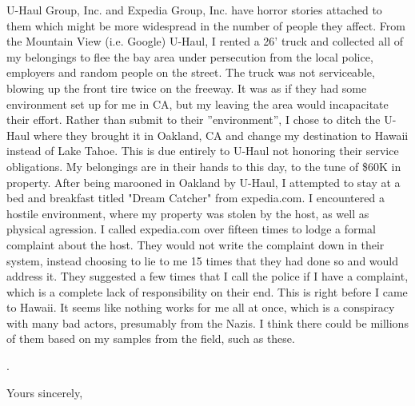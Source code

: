 \documentclass[a4paper]{arthur-letter}
\begin{document}
\begin{letter}
    U-Haul Group, Inc. and Expedia Group, Inc. have horror stories attached to them which might be more widespread in the number of people they affect. From the Mountain View (i.e. Google) U-Haul, I rented a 26' truck and collected all of my belongings to flee the bay area under persecution from the local police, employers and random people on the street. The truck was not serviceable, blowing up the front tire twice on the freeway. It was as if they had some environment set up for me in CA, but my leaving the area would incapacitate their effort. Rather than submit to their ''environment'', I chose to ditch the U-Haul where they brought it in Oakland, CA and change my destination to Hawaii instead of Lake Tahoe. This is due entirely to U-Haul not honoring their service obligations. My belongings are in their hands to this day, to the tune of \$60K in property. After being marooned in Oakland by U-Haul, I attempted to stay at a bed and breakfast titled "Dream Catcher" from expedia.com. I encountered a hostile environment, where my property was stolen by the host, as well as physical agression. I called expedia.com over fifteen times to lodge a formal complaint about the host. They would not write the complaint down in their system, instead choosing to lie to me 15 times that they had done so and would address it. They suggested a few times that I call the police if I have a complaint, which is a complete lack of responsibility on their end. This is right before I came to Hawaii. It seems like nothing works for me all at once, which is a conspiracy with many bad actors, presumably from the Nazis. I think there could be millions of them based on my samples from the field, such as these.
    
            
    \cite{targetcorporationhitlersalute} \cite{bigbangtheoryhouse5058pendleton} \cite{stripmalls} \cite{deptofva} \cite{googlenaziexpose} .
    
    
            
            \closing{Yours sincerely,} %


    \end{letter}
    
\end{document}

